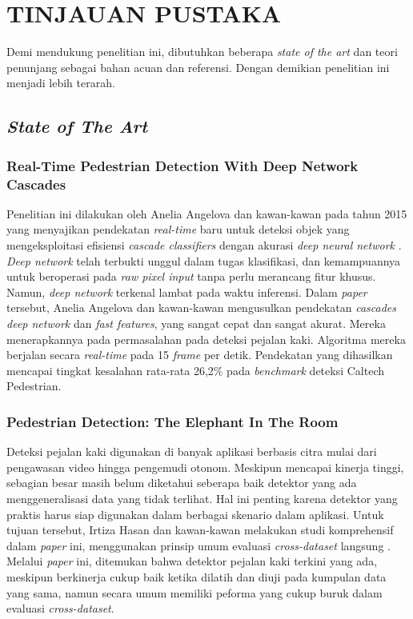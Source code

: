 \chapter{TINJAUAN PUSTAKA}
\label{chap:tinjauanpustaka}


Demi mendukung penelitian ini, dibutuhkan beberapa \textit{state of the art} dan teori penunjang sebagai bahan acuan dan referensi. Dengan demikian penelitian ini menjadi lebih terarah.

\section{\textit{State of The Art}}
\label{penelitianterkait}

\subsection{Real-Time Pedestrian Detection With Deep Network Cascades}
\label{realtime-pedestrian}

Penelitian ini dilakukan oleh Anelia Angelova dan kawan-kawan pada tahun 2015 yang menyajikan pendekatan \textit{real-time} baru untuk deteksi objek yang mengeksploitasi efisiensi \textit{cascade classifiers} dengan akurasi \textit{deep neural network} \citep{penelitianterkait1}. \textit{Deep network} telah terbukti unggul dalam tugas klasifikasi, dan kemampuannya untuk beroperasi pada \textit{raw pixel input} tanpa perlu merancang fitur khusus. Namun, \textit{deep network} terkenal lambat pada waktu inferensi. Dalam \textit{paper} tersebut, Anelia Angelova dan kawan-kawan mengusulkan pendekatan \textit{cascades deep network} dan \textit{fast features}, yang sangat cepat dan sangat akurat. Mereka menerapkannya pada permasalahan pada deteksi pejalan kaki. Algoritma mereka berjalan secara \textit{real-time} pada 15 \textit{frame} per detik. Pendekatan yang dihasilkan mencapai tingkat kesalahan rata-rata 26,2\% pada \textit{benchmark} deteksi Caltech Pedestrian.

\subsection{Pedestrian Detection: The Elephant In The Room}
\label{pedestrian-detection}

Deteksi pejalan kaki digunakan di banyak aplikasi berbasis citra mulai dari pengawasan video hingga pengemudi otonom. Meskipun mencapai kinerja tinggi, sebagian besar masih belum diketahui seberapa baik detektor yang ada menggeneralisasi data yang tidak terlihat. Hal ini penting karena detektor yang praktis harus siap digunakan dalam berbagai skenario dalam aplikasi. Untuk tujuan tersebut, Irtiza Hasan dan kawan-kawan melakukan studi komprehensif dalam \textit{paper} ini, menggunakan prinsip umum evaluasi \textit{cross-dataset} langsung \citep{pedestrian-detection}. Melalui \textit{paper} ini, ditemukan bahwa detektor pejalan kaki terkini yang ada, meskipun berkinerja cukup baik ketika dilatih dan diuji pada kumpulan data yang sama, namun secara umum memiliki peforma yang cukup buruk dalam evaluasi \textit{cross-dataset}. 

